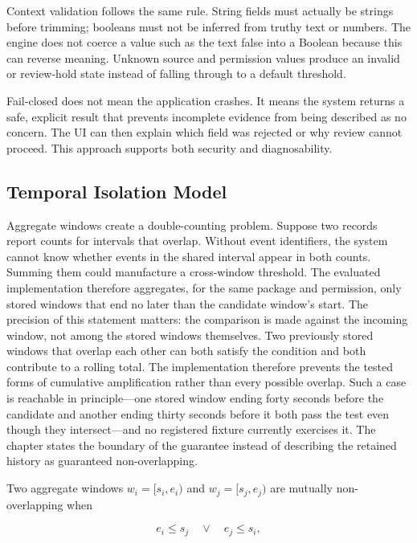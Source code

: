 Context validation follows the same rule. String fields must actually be strings before trimming; booleans must not be inferred from truthy text or numbers. The engine does not coerce a value such as the text false into a Boolean because this can reverse meaning. Unknown source and permission values produce an invalid or review-hold state instead of falling through to a default threshold.

Fail-closed does not mean the application crashes. It means the system returns a safe, explicit result that prevents incomplete evidence from being described as no concern. The UI can then explain which field was rejected or why review cannot proceed. This approach supports both security and diagnosability.

\subsection{Temporal Isolation Model}

Aggregate windows create a double-counting problem. Suppose two records report counts for intervals that overlap. Without event identifiers, the system cannot know whether events in the shared interval appear in both counts. Summing them could manufacture a cross-window threshold. The evaluated implementation therefore aggregates, for the same package and permission, only stored windows that end no later than the candidate window's start. The precision of this statement matters: the comparison is made against the incoming window, not among the stored windows themselves. Two previously stored windows that overlap each other can both satisfy the condition and both contribute to a rolling total. The implementation therefore prevents the tested forms of cumulative amplification rather than every possible overlap. Such a case is reachable in principle---one stored window ending forty seconds before the candidate and another ending thirty seconds before it both pass the test even though they intersect---and no registered fixture currently exercises it. The chapter states the boundary of the guarantee instead of describing the retained history as guaranteed non-overlapping.

Two aggregate windows \(w_i=[s_i,e_i)\) and \(w_j=[s_j,e_j)\) are mutually non-overlapping when

\begin{equation}
e_i \leq s_j \quad \lor \quad e_j \leq s_i,
\end{equation}


